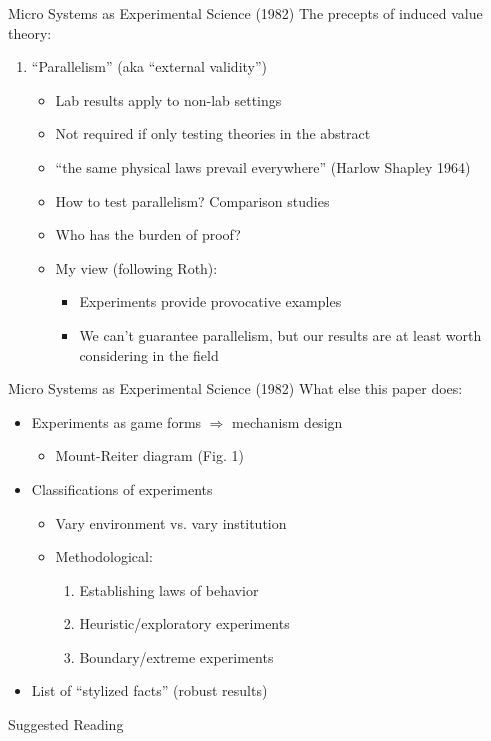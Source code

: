 \begin{frame}{Micro Systems as Experimental Science (1982)}
    The precepts of induced value theory:
    \begin{enumerate}
        \conti
        \item ``Parallelism'' (aka ``external validity'')
        \begin{itemize}
            \item Lab results apply to non-lab settings
            \item Not required if only testing theories in the abstract
            \item ``the same physical laws prevail everywhere'' (Harlow Shapley 1964)
            \item How to test parallelism? Comparison studies
            \item Who has the burden of proof?
            \item My view (following Roth):
            \begin{itemize}
                \item Experiments provide provocative examples
                \item We can't guarantee parallelism, but our results are at least worth considering in the field
            \end{itemize}
        \end{itemize}
        \seti
    \end{enumerate}
\end{frame}

\begin{frame}{Micro Systems as Experimental Science (1982)}
    What else this paper does:
    \begin{itemize}
        \item Experiments as game forms $\Rightarrow$ mechanism design
        \begin{itemize}
            \item Mount-Reiter diagram (Fig. 1)
        \end{itemize}
        \item Classifications of experiments
        \begin{itemize}
            \item Vary environment vs. vary institution
            \item Methodological:
            \begin{enumerate}
                \item Establishing laws of behavior
                \item Heuristic/exploratory experiments
                \item Boundary/extreme experiments
            \end{enumerate}
        \end{itemize}
        \item List of ``stylized facts'' (robust results)
    \end{itemize}
\end{frame}

\nocite{Smith1976,Smith1982,Smith1979}

\begin{frame}[allowframebreaks]{Suggested Reading}
    
\end{frame}

